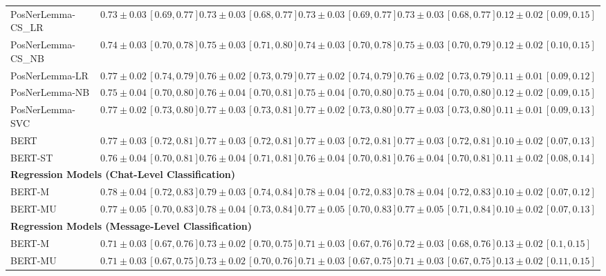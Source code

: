 \documentclass[twocolumn]{ceurart}
\begin{document}
\begin{table}[H]
{\begin{tabular}{@{}lcccccc@{}}
            PosNerLemma-CS\_LR & $0.73 \pm 0.03\,[0.69, 0.77]$ & $0.73 \pm 0.03\,[0.68, 0.77]$ & $0.73 \pm 0.03\,[0.69, 0.77]$ & $0.73 \pm 0.03\,[0.68, 0.77]$ & $0.12 \pm 0.02\,[0.09, 0.15]$ \\
            PosNerLemma-CS\_NB & $0.74 \pm 0.03\,[0.70, 0.78]$ & $0.75 \pm 0.03\,[0.71, 0.80]$ & $0.74 \pm 0.03\,[0.70, 0.78]$ & $0.75 \pm 0.03\,[0.70, 0.79]$ & $0.12 \pm 0.02\,[0.10, 0.15]$ \\
            PosNerLemma-LR & $0.77 \pm 0.02\,[0.74, 0.79]$ & $0.76 \pm 0.02\,[0.73, 0.79]$ & $0.77 \pm 0.02\,[0.74, 0.79]$ & $0.76 \pm 0.02\,[0.73, 0.79]$ & $0.11 \pm 0.01\,[0.09, 0.12]$ \\
            PosNerLemma-NB & $0.75 \pm 0.04\,[0.70, 0.80]$ & $0.76 \pm 0.04\,[0.70, 0.81]$ & $0.75 \pm 0.04\,[0.70, 0.80]$ & $0.75 \pm 0.04\,[0.70, 0.80]$ & $0.12 \pm 0.02\,[0.09, 0.15]$ \\
            PosNerLemma-SVC & $0.77 \pm 0.02\,[0.73, 0.80]$ & $0.77 \pm 0.03\,[0.73, 0.81]$ & $0.77 \pm 0.02\,[0.73, 0.80]$ & $0.77 \pm 0.03\,[0.73, 0.80]$ & $0.11 \pm 0.01\,[0.09, 0.13]$ \\
            BERT & $0.77 \pm 0.03\,[0.72, 0.81]$ & $0.77 \pm 0.03\,[0.72, 0.81]$ & $0.77 \pm 0.03\,[0.72, 0.81]$ & $0.77 \pm 0.03\,[0.72, 0.81]$ & $0.10 \pm 0.02\,[0.07, 0.13]$\\
            BERT-ST & $0.76 \pm 0.04\,[0.70, 0.81]$ & $0.76 \pm 0.04\,[0.71, 0.81]$ & $0.76 \pm 0.04\,[0.70, 0.81]$ & $0.76 \pm 0.04\,[0.70, 0.81]$ & $0.11 \pm 0.02\,[0.08, 0.14]$\\
            \midrule
            \multicolumn{6}{l}{\textbf{Regression Models (Chat-Level Classification)}} \\
            \midrule
            BERT-M & $0.78 \pm 0.04\,[0.72, 0.83]$ & $0.79 \pm 0.03\,[0.74, 0.84]$ & $0.78 \pm 0.04\,[0.72, 0.83]$ & $0.78 \pm 0.04\,[0.72, 0.83]$ & $0.10 \pm 0.02\,[0.07, 0.12]$\\
            BERT-MU & $0.77 \pm 0.05\,[0.70, 0.83]$ & $0.78 \pm 0.04\,[0.73, 0.84]$ & $0.77 \pm 0.05\,[0.70, 0.83]$ & $0.77 \pm 0.05\,[0.71, 0.84]$ & $0.10 \pm 0.02\,[0.07, 0.13]$\\
            \midrule
            \multicolumn{6}{l}{\textbf{Regression Models (Message-Level Classification)}} \\
            \midrule
            BERT-M & $0.71 \pm 0.03\,[0.67, 0.76]$ & $0.73 \pm 0.02\,[0.70, 0.75]$ & $0.71 \pm 0.03\,[0.67, 0.76]$ & $0.72 \pm 0.03\,[0.68, 0.76]$ & $0.13 \pm 0.02\,[0.1, 0.15]$\\
            BERT-MU & $0.71 \pm 0.03\,[0.67, 0.75]$ & $0.73 \pm 0.02\,[0.70, 0.76]$ & $0.71 \pm 0.03\,[0.67, 0.75]$ & $0.71 \pm 0.03\,[0.67, 0.75]$ & $0.13 \pm 0.02\,[0.11, 0.15]$\\
            \bottomrule
        \end{tabular}%
    }
\end{table}
\end{document}
